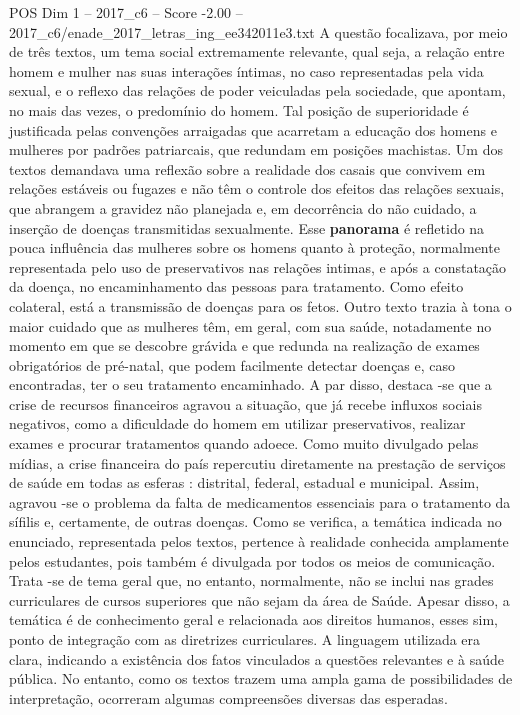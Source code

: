 \begin{textsample}{POS Dim 1 – 2017\_c6 – Score -2.00 – 2017\_c6/enade\_2017\_letras\_ing\_ee342011e3.txt}
A questão focalizava, por meio de três textos, um tema social extremamente relevante, qual seja, a relação entre homem e mulher nas suas interações íntimas, no caso representadas pela vida sexual, e o reflexo das relações de poder veiculadas pela sociedade, que apontam, no mais das vezes, o predomínio do homem.
Tal posição de superioridade é justificada pelas convenções arraigadas que acarretam a educação dos homens e mulheres por padrões patriarcais, que redundam em posições machistas.
Um dos textos demandava uma reflexão sobre a realidade dos casais que convivem em relações estáveis ou fugazes e não têm o controle dos efeitos das relações sexuais, que abrangem a gravidez não planejada e, em decorrência do não cuidado, a inserção de doenças transmitidas sexualmente.
Esse \textbf{panorama} é refletido na pouca influência das mulheres sobre os homens quanto à proteção, normalmente representada pelo uso de preservativos nas relações intimas, e após a constatação da doença, no encaminhamento das pessoas para tratamento.
Como efeito colateral, está a transmissão de doenças para os fetos.
Outro texto trazia à tona o maior cuidado que as mulheres têm, em geral, com sua saúde, notadamente no momento em que se descobre grávida e que redunda na realização de exames obrigatórios de pré-natal, que podem facilmente detectar doenças e, caso encontradas, ter o seu tratamento encaminhado.
A par disso, destaca -se que a crise de recursos financeiros agravou a situação, que já recebe influxos sociais negativos, como a dificuldade do homem em utilizar preservativos, realizar exames e procurar tratamentos quando adoece.
Como muito divulgado pelas mídias, a crise financeira do país repercutiu diretamente na prestação de serviços de saúde em todas as esferas : distrital, federal, estadual e municipal.
Assim, agravou -se o problema da falta de medicamentos essenciais para o tratamento da sífilis e, certamente, de outras doenças.
Como se verifica, a temática indicada no enunciado, representada pelos textos, pertence à realidade conhecida amplamente pelos estudantes, pois também é divulgada por todos os meios de comunicação.
Trata -se de tema geral que, no entanto, normalmente, não se inclui nas grades curriculares de cursos superiores que não sejam da área de Saúde.
Apesar disso, a temática é de conhecimento geral e relacionada aos direitos humanos, esses sim, ponto de integração com as diretrizes curriculares.
A linguagem utilizada era clara, indicando a existência dos fatos vinculados a questões relevantes e à saúde pública.
No entanto, como os textos trazem uma ampla gama de possibilidades de interpretação, ocorreram algumas compreensões diversas das esperadas.

\end{textsample}

